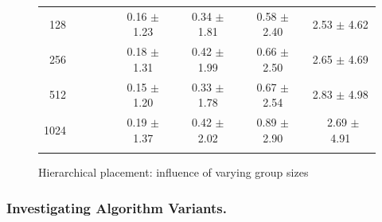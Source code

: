 \begin{figure}[t]
\begin{minipage}{.60\textwidth}
{{\begin{tabular}[b]{|r@{\:}||@{\:}c@{\:}|@{\:}c@{\:}|@{\:}c@{\:}|@{\:}c@{\:}|}
        128~~~~~~~ &   0.16 $\pm$   1.23 &   0.34 $\pm$   1.81 &   0.58 $\pm$   2.40 &   2.53 $\pm$   4.62  \\
        256~~~~~~~ &   0.18 $\pm$   1.31 &   0.42 $\pm$   1.99 &   0.66 $\pm$   2.50 &   2.65 $\pm$   4.69  \\
        512~~~~~~~ &   0.15 $\pm$   1.20 &   0.33 $\pm$   1.78 &   0.67 $\pm$   2.54 &   2.83 $\pm$   4.98  \\
       1024~~~~~~~ &   0.19 $\pm$   1.37 &   0.42 $\pm$   2.02 &   0.89 $\pm$   2.90 &   ~2.69 $\pm$   4.91

      \Rstrut  \\ \hline
      \thickhline
  \end{tabular} }
  \label{fig:groupSizesComputationTime}
  }
\end{minipage}
\vspace*{-.6cm}
\caption{Hierarchical placement: influence of varying group sizes}
\label{fig:snoozeGroupSizes}
\vspace*{-.6cm}
\end{figure}

\subsubsection{Investigating Algorithm Variants.}

